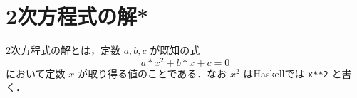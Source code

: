 \documentclass[a5paper,twoside,fleqn]{jsbook}
\newcommand{\programminglanguage}[1]{\textsf{#1}}
\newcommand{\haskell}{\programminglanguage{Haskell}}
\newcommand{\code}[1]{\texttt{#1}}
\begin{document}

\section{2次方程式の解*}

2次方程式の解とは，定数 $a,b,c$ が既知の式
\begin{equation}
a*x^2+b*x+c=0
\end{equation}
において定数 $x$ が取り得る値のことである．なお $x^2$ は\haskell では
\code{x**2} と書く．
\end{document}
